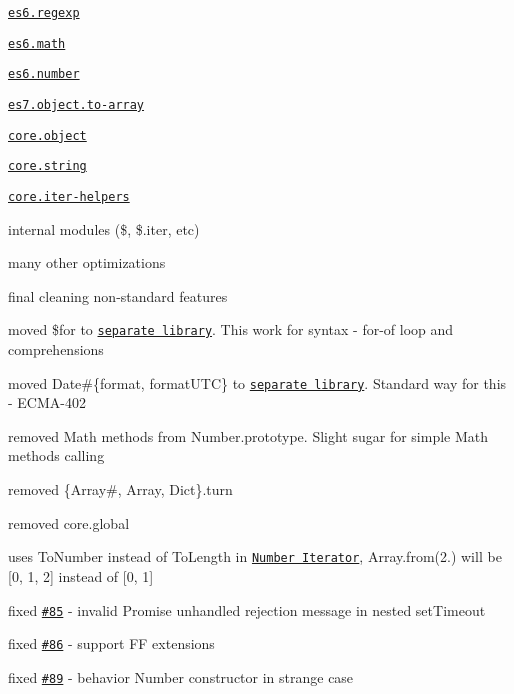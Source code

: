 \begin{DoxyItemize}
\begin{DoxyItemize}
\item \href{https://github.com/zloirock/core-js/#ecmascript-6-regexp}{\tt {\ttfamily es6.\+regexp}}
\item \href{https://github.com/zloirock/core-js/#ecmascript-6-math}{\tt {\ttfamily es6.\+math}}
\item \href{https://github.com/zloirock/core-js/#ecmascript-6-number}{\tt {\ttfamily es6.\+number}}
\item \href{https://github.com/zloirock/core-js/#ecmascript-7}{\tt {\ttfamily es7.\+object.\+to-\/array}}
\item \href{https://github.com/zloirock/core-js/#object}{\tt {\ttfamily core.\+object}}
\item \href{https://github.com/zloirock/core-js/#escaping-html}{\tt {\ttfamily core.\+string}}
\item \href{https://github.com/zloirock/core-js/#ecmascript-6-iterators}{\tt {\ttfamily core.\+iter-\/helpers}}
\item internal modules ({\ttfamily \$}, {\ttfamily \$.iter}, etc)
\end{DoxyItemize}
\item many other optimizations
\item final cleaning non-\/standard features
\begin{DoxyItemize}
\item moved {\ttfamily \$for} to \href{https://github.com/zloirock/forof}{\tt separate library}. This work for syntax -\/ {\ttfamily for-\/of} loop and comprehensions
\item moved {\ttfamily Date\#\{format, format\+U\+TC\}} to \href{https://github.com/zloirock/dtf}{\tt separate library}. Standard way for this -\/ {\ttfamily E\+C\+M\+A-\/402}
\item removed {\ttfamily Math} methods from {\ttfamily Number.\+prototype}. Slight sugar for simple {\ttfamily Math} methods calling
\item removed {\ttfamily \{Array\#, Array, Dict\}.turn}
\item removed {\ttfamily core.\+global}
\end{DoxyItemize}
\item uses {\ttfamily To\+Number} instead of {\ttfamily To\+Length} in \href{https://github.com/zloirock/core-js/#number-iterator}{\tt {\ttfamily Number Iterator}}, {\ttfamily Array.\+from(2.)} will be {\ttfamily \mbox{[}0, 1, 2\mbox{]}} instead of {\ttfamily \mbox{[}0, 1\mbox{]}}
\item fixed \href{https://github.com/zloirock/core-js/issues/85}{\tt \#85} -\/ invalid {\ttfamily Promise} unhandled rejection message in nested {\ttfamily set\+Timeout}
\item fixed \href{https://github.com/zloirock/core-js/issues/86}{\tt \#86} -\/ support FF extensions
\item fixed \href{https://github.com/zloirock/core-js/issues/89}{\tt \#89} -\/ behavior {\ttfamily Number} constructor in strange case
\end{DoxyItemize}

